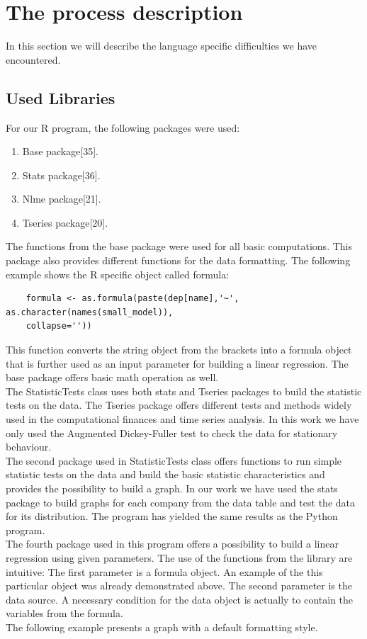 \documentclass[
  twoside,
  11pt, a4paper,
  footinclude=true,
  headinclude=true,
  cleardoublepage=empty
]{scrreprt}
\begin{document}
    \section{The process description}
    In this section we will describe the language specific difficulties we have encountered.
    \subsection{Used Libraries}
    For our R program, the following packages were used:
    \begin{enumerate}
        \item Base package[35].
        \item Stats package[36].
        \item Nlme package[21].
        \item Tseries package[20].
    \end{enumerate}
    The functions from the base package were used for all basic computations. This package also provides different functions for the data formatting. The following example shows the R specific object called formula:
    \begin{verbatim}
    formula <- as.formula(paste(dep[name],'~', as.character(names(small_model)),
    collapse=''))
    \end{verbatim}
    This function converts the string object from the brackets into a formula object that is further used as an input parameter for building a linear regression. The base package offers basic math operation as well.\\
    The StatisticTests class uses both stats and Tseries packages to build the statistic tests on the data. The Tseries package offers different tests and methods widely used in the computational finances and time series analysis. In this work we have only used the Augmented Dickey-Fuller test to check the data for stationary behaviour.\\
    The second package used in StatisticTests class offers functions to run simple statistic tests on the data and build the basic statistic characteristics and provides the possibility to build a graph. In our work we have used the stats package to build graphs for each company from the data table and test the data for its distribution. The program has yielded the same results as the Python program.\\
    The fourth package used in this program offers a possibility to build a linear regression using given parameters. The use of the functions from the library are intuitive:
    The first parameter is a formula object. An example of the this particular object was already demonstrated above. The second parameter is the data source. A necessary condition for the data object is actually to contain the variables from the formula.\\
    The following example presents a graph with a default formatting style.
    
\end{document}

